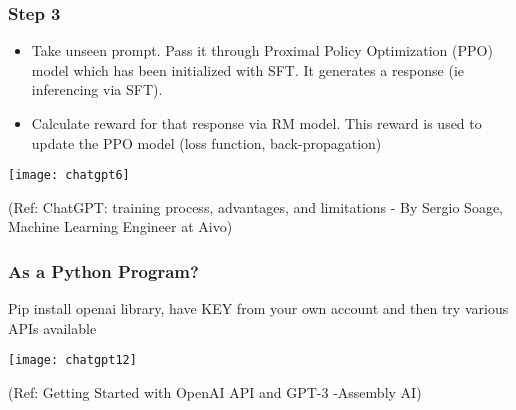 			
			
			


\begin{frame}[fragile]\frametitle{Step 3}

\begin{itemize}
\item Take unseen prompt. Pass it through Proximal Policy Optimization (PPO) model which has been initialized with SFT. It generates a response (ie inferencing via SFT).
\item Calculate reward for that response via RM model. This reward is used to update the PPO model (loss function, back-propagation)
\end{itemize}	 

			\begin{center}
			\texttt{[image: chatgpt6]}
			
			\end{center}		
			
			{\tiny (Ref: ChatGPT: training process, advantages, and limitations - By Sergio Soage, Machine Learning Engineer at Aivo)}
			
\end{frame}


\begin{frame}[fragile]\frametitle{As a Python Program?}
Pip install openai library, have KEY from your own account and then try various APIs available

	\begin{center}
	\texttt{[image: chatgpt12]}
	
	\end{center}		
	
	{\tiny (Ref: Getting Started with OpenAI API and GPT-3 -Assembly AI)}
			

\end{frame}

